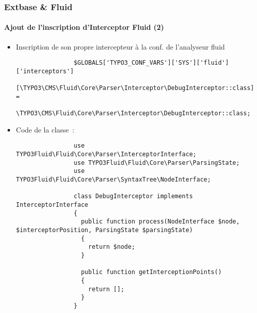 \begin{frame}[fragile]
	\frametitle{Extbase \& Fluid}
	\framesubtitle{Ajout de l'inscription d'Interceptor Fluid (2)}

	\lstset{basicstyle=\tiny\ttfamily}

	\begin{itemize}

		\item Inscription de son propre intercepteur à la conf. de l'analyseur fluid

			\begin{lstlisting}
				$GLOBALS['TYPO3_CONF_VARS']['SYS']['fluid']['interceptors']
			      [\TYPO3\CMS\Fluid\Core\Parser\Interceptor\DebugInterceptor::class] =
				  \TYPO3\CMS\Fluid\Core\Parser\Interceptor\DebugInterceptor::class;
			\end{lstlisting}

		\item Code de la classe~:

			\begin{lstlisting}
				use TYPO3Fluid\Fluid\Core\Parser\InterceptorInterface;
				use TYPO3Fluid\Fluid\Core\Parser\ParsingState;
				use TYPO3Fluid\Fluid\Core\Parser\SyntaxTree\NodeInterface;

				class DebugInterceptor implements InterceptorInterface
				{
				  public function process(NodeInterface $node, $interceptorPosition, ParsingState $parsingState)
				  {
				    return $node;
				  }

				  public function getInterceptionPoints()
				  {
				    return [];
				  }
				}
			\end{lstlisting}

	\end{itemize}

\end{frame}


